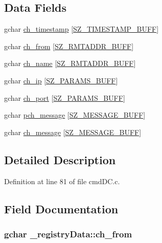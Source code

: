 \subsection*{Data Fields}
\begin{DoxyCompactItemize}
\item 
gchar \hyperlink{struct__registry_data_a362a4edf89daafe79565053dd70892c4}{ch\+\_\+timestamp} \mbox{[}\hyperlink{gtk_d_s_8c_ac08ad1b127f1c9743c5592ffb796423f}{S\+Z\+\_\+\+T\+I\+M\+E\+S\+T\+A\+M\+P\+\_\+\+B\+U\+F\+F}\mbox{]}
\item 
gchar \hyperlink{struct__registry_data_a5fac46820690525a9d8b3f0185bca587}{ch\+\_\+from} \mbox{[}\hyperlink{gtk_d_s_8c_a152ca8fa1a2eac39d1badafb6c6cef8c}{S\+Z\+\_\+\+R\+M\+T\+A\+D\+D\+R\+\_\+\+B\+U\+F\+F}\mbox{]}
\item 
gchar \hyperlink{struct__registry_data_a4764e2a72c3ba9177b6c4803cfa03f72}{ch\+\_\+name} \mbox{[}\hyperlink{gtk_d_s_8c_a152ca8fa1a2eac39d1badafb6c6cef8c}{S\+Z\+\_\+\+R\+M\+T\+A\+D\+D\+R\+\_\+\+B\+U\+F\+F}\mbox{]}
\item 
gchar \hyperlink{struct__registry_data_a814e064e77a6aac5866c88cb51acd971}{ch\+\_\+ip} \mbox{[}\hyperlink{gtk_d_s_8c_ac21e8a77d073e7a5383c92bb485992c8}{S\+Z\+\_\+\+P\+A\+R\+A\+M\+S\+\_\+\+B\+U\+F\+F}\mbox{]}
\item 
gchar \hyperlink{struct__registry_data_a74f03616af9ec9770266cb7988fe1a71}{ch\+\_\+port} \mbox{[}\hyperlink{gtk_d_s_8c_ac21e8a77d073e7a5383c92bb485992c8}{S\+Z\+\_\+\+P\+A\+R\+A\+M\+S\+\_\+\+B\+U\+F\+F}\mbox{]}
\item 
gchar \hyperlink{struct__registry_data_aad089cfecaeccff2c9c6bb7a97d46706}{pch\+\_\+message} \mbox{[}\hyperlink{gtk_d_s_8c_ab5903aa853c3769389e570c8490feb1e}{S\+Z\+\_\+\+M\+E\+S\+S\+A\+G\+E\+\_\+\+B\+U\+F\+F}\mbox{]}
\item 
gchar \hyperlink{struct__registry_data_ae9b0c1e6f13d980dcc7515def6b20b5e}{ch\+\_\+message} \mbox{[}\hyperlink{gtk_d_s_8c_ab5903aa853c3769389e570c8490feb1e}{S\+Z\+\_\+\+M\+E\+S\+S\+A\+G\+E\+\_\+\+B\+U\+F\+F}\mbox{]}
\end{DoxyCompactItemize}


\subsection{Detailed Description}


Definition at line 81 of file cmd\+D\+C.\+c.



\subsection{Field Documentation}
\hypertarget{struct__registry_data_a5fac46820690525a9d8b3f0185bca587}{
\subsubsection[{ch\+\_\+from}]{\setlength{\rightskip}{0pt plus 5cm}gchar \+\_\+registry\+Data\+::ch\+\_\+from}}\label{struct__registry_data_a5fac46820690525a9d8b3f0185bca587}


